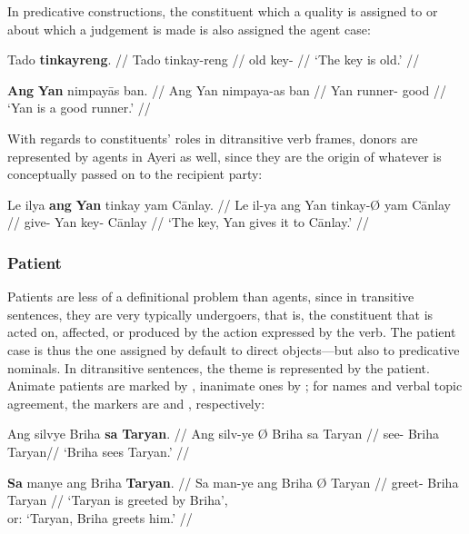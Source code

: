 \xe

In predicative constructions, the constituent which a quality is assigned to or 
about which a judgement is made is also assigned the agent case:

\pex
\a\begingl
	\gla Tado \textbf{tinkayreng}. //
	\glb Tado tinkay-reng //
	\glc old key-\AargI{} //
	\glft `The key is old.' //
\endgl

\a\begingl
	\gla \textbf{Ang} \textbf{Yan} nimpayās ban. //
	\glb Ang Yan nimpaya-as ban //
	\glc \Aarg{} Yan runner-\Parg{} good //
	\glft `Yan is a good runner.' //
\endgl

\xe


With regards to constituents' roles in ditransitive verb frames, donors are 
represented by agents in Ayeri as well, since they are the origin of whatever 
is conceptually passed on to the recipient party:

\ex\begingl
	\gla Le ilya \textbf{ang} \textbf{Yan} tinkay yam Cānlay. //
	\glb Le il-ya ang Yan tinkay-Ø yam Cānlay //
	\glc \PatT{} give-\TsgM{} \Aarg{} Yan key-\Top{} \Dat{} Cānlay //
	\glft `The key, Yan gives it to Cānlay.' //
\endgl\xe

\subsubsection{Patient}

Patients are less of a definitional problem than agents, since in transitive 
sentences, they are very typically undergoers, that is, the constituent that is 
acted on, affected, or produced by the action expressed by the verb. The 
patient case is thus the one assigned by default to direct objects---but also 
to predicative nominals. In ditransitive sentences, the theme is represented by 
the patient. Animate patients are marked by , inanimate ones by 
; for names and verbal topic agreement, the markers are 
 and , respectively:

\pex
\a\begingl
	\gla Ang silvye {} Briha \textbf{sa} \textbf{Taryan}. //
	\glb Ang silv-ye Ø Briha sa Taryan //
	\glc \AgtT{} see-\TsgF{} \Top{} Briha \Parg{} Taryan//
	\glft `Briha sees Taryan.' //
\endgl

\a\begingl
	\gla \textbf{Sa} manye ang Briha \textbf{{}} \textbf{Taryan}. //
	\glb Sa man-ye ang Briha Ø Taryan //
	\glc \PatT{} greet-\TsgF{} \Aarg{} Briha \Top{} Taryan //
	\glft `Taryan is greeted by Briha',\\
		or: `Taryan, Briha greets him.' //
\endgl


